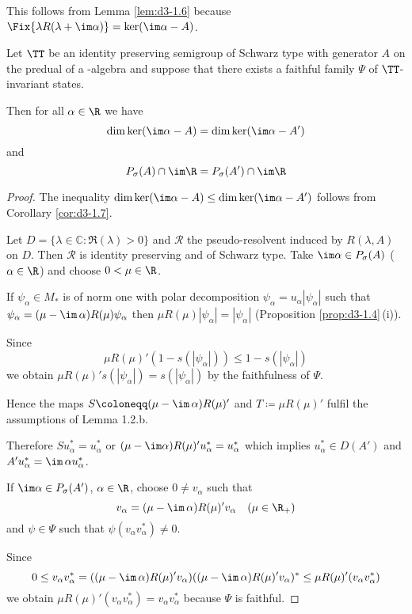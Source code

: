 This follows from Lemma \ref{lem:d3-1.6} because $\Fix{\lambda R(\lambda+\im\alpha)} = \ker(\im\alpha-A)$.
\begin{proposition}\label{prop:d3-1.8}
Let $\TT$ be an identity preserving semigroup of Schwarz type with generator $A$ on the predual of a \WA-algebra and suppose that there exists a faithful family $\Psi$ of $\TT$-invariant states.

Then for all $\alpha \in \R$ we have
\[
\dim \ker(\im\alpha - A) = \dim \ker(\im\alpha - A')
\]
and
\[
P_{\sigma}(A) \cap \im\R = P_{\sigma}(A') \cap \im\R
\]
\end{proposition}

\begin{proof}
The inequality $\dim \ker(\im\alpha - A) \leq \dim \ker(\im\alpha - A')$ follows from Corollary \ref{cor:d3-1.7}.

Let $D = \{\lambda \in \mathbb{C} \colon \Re(\lambda) > 0\}$ and $\mathcal{R}$ the pseudo-resolvent induced by $R(\lambda,A)$ on $D$.
Then $\mathcal{R}$ is identity preserving and of Schwarz type.
Take $\im\alpha \in P_{\sigma}(A)$ ($\alpha \in \R$) and choose $0 < \mu \in \R$.

If $\psi_{\alpha} \in M_{*}$ is of norm one with polar decomposition $\psi_{\alpha} = u_{\alpha}|\psi_{\alpha}|$ such that $\psi_{\alpha} = (\mu - \im\,\alpha)R(\mu)\psi_{\alpha}$ then $\mu R(\mu)|\psi_{\alpha}| = |\psi_{\alpha}|$ (Proposition \ref{prop:d3-1.4}\,(i)).

Since
\[
\mu R(\mu)'(1 - s(|\psi_{\alpha}|)) \leq 1 - s(|\psi_{\alpha}|)
\]
we obtain $\mu R(\mu)'s(|\psi_{\alpha}|) = s(|\psi_{\alpha}|)$ by the faithfulness of $\Psi$.

Hence the maps $S \coloneqq (\mu - \im\,\alpha)R(\mu)'$ and $T \coloneqq \mu R(\mu)'$ fulfil the assumptions of Lemma 1.2.b.

Therefore $Su_{\alpha}^{*} = u_{\alpha}^{*}$ or $(\mu-\im\alpha)R(\mu)'u_{\alpha}^{*} = u_{\alpha}^{*}$ which implies $u_{\alpha}^{*} \in D(A')$ and $A'u_{\alpha}^{*} = \im\,\alpha u_{\alpha}^{*}$.

If $\im\alpha \in P_{\sigma}(A')$, $\alpha \in \R$, choose $0 \neq v_{\alpha}$ such that
\[
v_{\alpha} = (\mu - \im\,\alpha)R(\mu)'v_{\alpha} \quad (\mu \in \R_{+})
\]
and $\psi \in \Psi$ such that $\psi(v_{\alpha}v_{\alpha}^{*}) \neq 0$.

Since
\[
0 \leq v_{\alpha}v_{\alpha}^{*} = ((\mu - \im\,\alpha)R(\mu)'v_{\alpha})((\mu - \im\,\alpha)R(\mu)'v_{\alpha})^{*} \leq \mu R(\mu)'(v_{\alpha}v_{\alpha}^{*})
\]
we obtain $\mu R(\mu)'(v_{\alpha}v_{\alpha}^{*}) = v_{\alpha}v_{\alpha}^{*}$ because $\Psi$ is faithful.


\end{proof}
